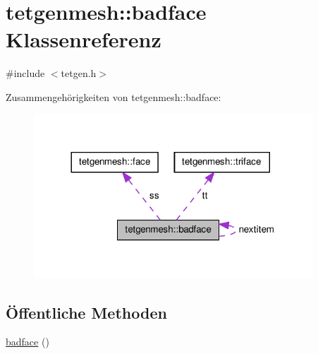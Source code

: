 \hypertarget{classtetgenmesh_1_1badface}{\section{tetgenmesh\-:\-:badface Klassenreferenz}
\label{classtetgenmesh_1_1badface}
}


{\ttfamily \#include $<$tetgen.\-h$>$}



Zusammengehörigkeiten von tetgenmesh\-:\-:badface\-:\nopagebreak
\begin{figure}[H]
\begin{center}
\leavevmode
\includegraphics[width=296pt]{classtetgenmesh_1_1badface__coll__graph}
\end{center}
\end{figure}
\subsection*{Öffentliche Methoden}
\begin{DoxyCompactItemize}
\item 
\hyperlink{classtetgenmesh_1_1badface_abb0568159042a95b91eb193fcfca6aab}{badface} ()
\end{DoxyCompactItemize}
